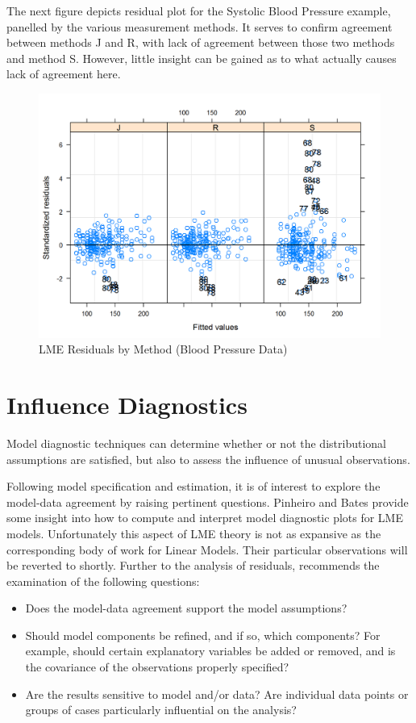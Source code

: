 \documentclass[12pt, a4paper]{report}
\theoremstyle{plain}
\theoremstyle{definition}
\theoremstyle{remark}
\begin{document}
	The next figure depicts residual plot for the Systolic Blood Pressure example, panelled by the various measurement methods. It serves to confirm agreement between methods J and R, with lack of agreement between those two methods and method S. However, little insight can be gained as to what actually causes lack of agreement here. 
	\begin{figure}[h!]
		\centering
		\includegraphics[width=0.8\linewidth]{images/bloodnlme-ResidPlot}
		\caption{LME Residuals by Method (Blood Pressure Data)}
		
	\end{figure}
	
	
	\newpage			
	\section{Influence Diagnostics}
	
	Model diagnostic techniques can determine whether or not the distributional assumptions are satisfied, but also to assess the influence of unusual observations. 
	
	
	Following model specification and estimation, it is of interest to explore the model-data
	agreement by raising pertinent questions. Pinheiro and Bates provide some insight into how to compute and interpret model diagnostic plots for LME models. Unfortunately this aspect of LME theory is not as expansive as the corresponding body of work for Linear Models. Their particular observations will be reverted to shortly. Further to the analysis of residuals, \citet{schabenberger} recommends the examination of the following questions:
	\begin{itemize}
		\item Does the model-data agreement support the model assumptions?
		\item Should model components be refined, and if so, which components? For example, should certain explanatory variables
		be added or removed, and is the covariance of the observations properly specified?
		\item Are the results sensitive to model and/or data? Are individual data points or groups of cases particularly
		influential on the analysis?
	\end{itemize}
	
\end{document}

